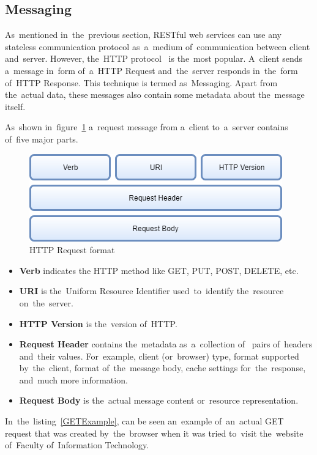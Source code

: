 \subsection{Messaging}
As~mentioned in~the~previous section, RESTful web services can use any stateless
communication protocol as~a~medium of~communication between client and~server.
However, the~HTTP protocol~\cite{HTTP} is the~most popular. A~client sends
a~message in~form of~a~HTTP Request and~the~server responds in~the~form of~HTTP Response. This
technique is termed as~Messaging. Apart from the~actual data, these messages
also contain some metadata about the~message itself.

As~shown in~figure~\ref{HTTPRequestFormat} a~request message from a~client
to~a~server contains of~five major parts.

\begin{figure}[!hbt]
	\centering
	\includegraphics[scale=0.65]{./obrazky-figures/html-request.png}
	\caption{HTTP Request format}
	\label{HTTPRequestFormat}
\end{figure}

\begin{itemize}
  \item \textbf{Verb} indicates the HTTP method like GET, PUT, POST, DELETE,
  etc.
  \item \textbf{URI} is the~Uniform Resource Identifier used~to~identify
  the~resource on~the~server.
  \item \textbf{HTTP Version} is the~version of~HTTP.
  \item \textbf{Request Header} contains the~metadata as~a~collection
  of~ pairs of~headers and~their values. For~example, client
  (or~browser) type, format supported by~the~client, format of~the~message body,
  cache settings for~the~response, and~much more information.
  \item \textbf{Request Body} is the~actual message content or~resource
  representation.
\end{itemize}

In~the~listing~\ref{GETExample}, can be seen an~example of~an~actual GET
request that was created by~the~browser when it was tried to~visit the~website
of~Faculty of~Information Technology.

